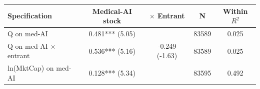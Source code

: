 \begin{tabular}{lcccc}
\toprule
Specification & Medical-AI stock & $\times$ Entrant & N & Within $R^2$ \\
\midrule
Q on med-AI & 0.481*** (5.05) &  & 83589 & 0.025 \\
Q on med-AI $\times$ entrant & 0.536*** (5.16) & -0.249 (-1.63) & 83589 & 0.025 \\
ln(MktCap) on med-AI & 0.128*** (5.34) &  & 83595 & 0.492 \\
\bottomrule
\end{tabular}